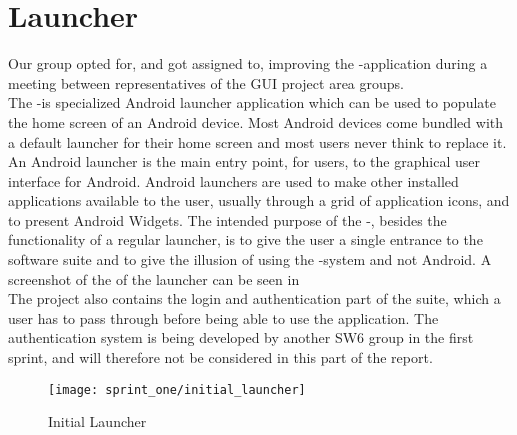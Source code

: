 
\section{Launcher}

Our group opted for, and got assigned to, improving the \giraf-\launcher application during a meeting between representatives of the GUI project area groups.\\

The \giraf-\launcher is specialized Android launcher application which can be used to populate the home screen of an Android device. Most Android devices come bundled with a default launcher for their home screen and most users never think to replace it. An Android launcher is the main entry point, for users, to the graphical user interface for Android. Android launchers are used to make other installed applications available to the user, usually through a grid of application icons, and to present Android Widgets. The intended purpose of the \giraf-\launcher, besides the functionality of a regular launcher, is to give the user a single entrance to the \giraf software suite and to give the illusion of using the \giraf-system and not Android. A screenshot of the  of the launcher can be seen in \\

The \launcher project also contains the login and authentication part of the \giraf suite, which a user has to pass through before being able to use the application. The authentication system is being developed by another SW6 group in the first sprint, and will therefore not be considered in this part of the report. 

\begin{figure}[!htbp]
	\centering
	\texttt{[image: sprint\_one/initial\_launcher]}
	\caption{Initial Launcher}
	\label{fig:initial_launcher}
\end{figure}
